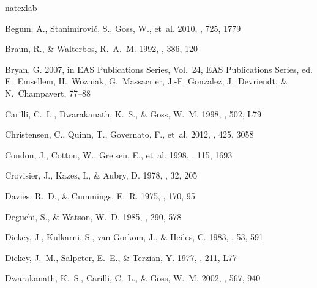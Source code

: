\documentclass{aastex}
\begin{document}



\begin{thebibliography}{}
\expandafter\ifx\csname natexlab\endcsname\relax\def\natexlab#1{#1}\fi

{Begum}, A., {Stanimirovi{\'c}}, S., {Goss}, W., {et~al.} 2010, \apj, 725, 1779

{Braun}, R., \& {Walterbos}, R.~A.~M. 1992, \apj, 386, 120

{Bryan}, G. 2007, in EAS Publications Series, Vol.~24, EAS Publications Series,
  ed. E.~{Emsellem}, H.~{Wozniak}, G.~{Massacrier}, J.-F. {Gonzalez},
  J.~{Devriendt}, \& N.~{Champavert}, 77--88

{Carilli}, C.~L., {Dwarakanath}, K.~S., \& {Goss}, W.~M. 1998, \apjl, 502, L79

{Christensen}, C., {Quinn}, T., {Governato}, F., {et~al.} 2012, \mnras, 425,
  3058

{Condon}, J., {Cotton}, W., {Greisen}, E., {et~al.} 1998, \aj, 115, 1693

{Crovisier}, J., {Kazes}, I., \& {Aubry}, D. 1978, \aaps, 32, 205

{Davies}, R.~D., \& {Cummings}, E.~R. 1975, \mnras, 170, 95

{Deguchi}, S., \& {Watson}, W.~D. 1985, \apj, 290, 578

{Dickey}, J., {Kulkarni}, S., {van Gorkom}, J., \& {Heiles}, C. 1983, \apjs,
  53, 591

{Dickey}, J.~M., {Salpeter}, E.~E., \& {Terzian}, Y. 1977, \apjl, 211, L77

{Dwarakanath}, K.~S., {Carilli}, C.~L., \& {Goss}, W.~M. 2002, \apj, 567, 940


\end{thebibliography}
\end{document}
